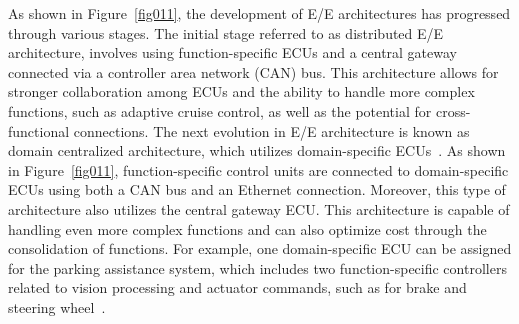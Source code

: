     
    As shown in Figure~\ref{fig011}, the development of E/E architectures has progressed through various stages. The initial stage referred to as distributed E/E architecture, involves using function-specific ECUs and a central gateway connected via a controller area network (CAN) bus. This architecture allows for stronger collaboration among ECUs and the ability to handle more complex functions, such as adaptive cruise control, as well as the potential for cross-functional connections. The next evolution in E/E architecture is known as domain centralized architecture, which utilizes domain-specific ECUs~\cite{askaripoor2022architecture}. As shown in Figure~\ref{fig011}, function-specific control units are connected to domain-specific ECUs using both a CAN bus and an Ethernet connection. Moreover, this type of architecture also utilizes the central gateway ECU. This architecture is capable of handling even more complex functions and can also optimize cost through the consolidation of functions. For example, one domain-specific ECU can be assigned for the parking assistance system, which includes two function-specific controllers related to vision processing and actuator commands, such as for brake and steering wheel~\cite{askaripoor2022architecture}.
    
    
    
